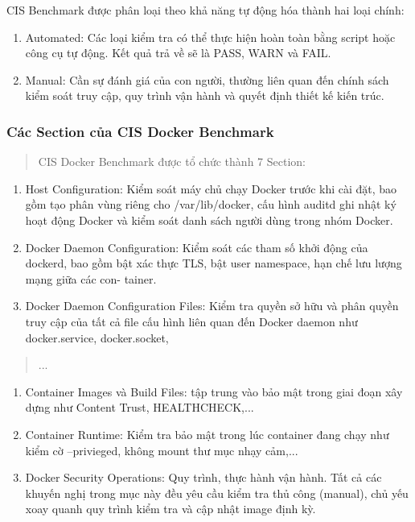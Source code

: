 CIS Benchmark được phân loại theo khả năng tự động hóa thành hai loại chính:

\begin{enumerate}
\def\labelenumi{(\arabic{enumi})}
\item
  Automated: Các loại kiểm tra có thể thực hiện hoàn toàn bằng script hoặc công cụ tự động. Kết quả trả về sẽ là PASS, WARN và FAIL.
\item
  Manual: Cần sự đánh giá của con người, thường liên quan đến chính sách kiểm soát truy cập, quy trình vận hành và quyết định thiết kế kiến trúc.
\end{enumerate}

\subsubsection{Các Section của CIS Docker Benchmark}\label{cuxe1c-section-cux1ee7a-cis-docker-benchmark}

\begin{quote}
CIS Docker Benchmark được tổ chức thành 7 Section:
\end{quote}

\begin{enumerate}
\def\labelenumi{(\arabic{enumi})}
\item
  Host Configuration: Kiểm soát máy chủ chạy Docker trước khi cài đặt, bao gồm tạo phân vùng riêng cho /var/lib/docker, cấu hình auditd ghi nhật ký hoạt động Docker và kiểm soát danh sách người dùng trong nhóm Docker.
\item
  Docker Daemon Configuration: Kiểm soát các tham số khởi động của dockerd, bao gồm bật xác thực TLS, bật user namespace, hạn chế lưu lượng mạng giữa các con- tainer.
\item
  Docker Daemon Configuration Files: Kiểm tra quyền sở hữu và phân quyền truy cập của tất cả file cấu hình liên quan đến Docker daemon như docker.service, docker.socket,
\end{enumerate}

\begin{quote}
...
\end{quote}

\begin{enumerate}
\def\labelenumi{(\arabic{enumi})}
\setcounter{enumi}{3}
\item
  Container Images và Build Files: tập trung vào bảo mật trong giai đoạn xây dựng như Content Trust, HEALTHCHECK,...
\item
  Container Runtime: Kiểm tra bảo mật trong lúc container đang chạy như kiểm cờ --privieged, không mount thư mục nhạy cảm,...
\item
  Docker Security Operations: Quy trình, thực hành vận hành. Tất cả các khuyến nghị trong mục này đều yêu cầu kiểm tra thủ công (manual), chủ yếu xoay quanh quy trình kiểm tra và cập nhật image định kỳ.
\end{enumerate}

